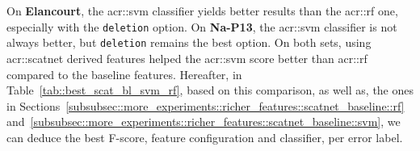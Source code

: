             On \textbf{Elancourt}, the \gls{acr::svm} classifier yields better results than the \gls{acr::rf} one, especially with the \texttt{deletion} option.
            On \textbf{Na-P13}, the \gls{acr::svm} classifier is not always better, but \texttt{deletion} remains the best option.
            On both sets, using \gls{acr::scatnet} derived features helped the \gls{acr::svm} score better than \gls{acr::rf} compared to the baseline features.
            Hereafter, in Table~\ref{tab::best_scat_bl_svm_rf}, based on this comparison, as well as, the ones in Sections~\ref{subsubsec::more_experiments::richer_features::scatnet_baseline::rf} and~\ref{subsubsec::more_experiments::richer_features::scatnet_baseline::svm}, we can deduce the best F-score, feature configuration and classifier, per error label.\\

